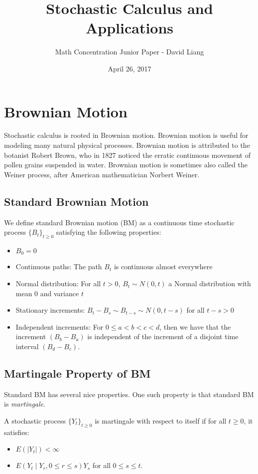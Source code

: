 \documentclass{article}
\title{Stochastic Calculus and Applications}
\author{Math Concentration Junior Paper - David Liang}
\date{April 26, 2017}
\begin{document}
\maketitle

\section{Brownian Motion}

Stochastic calculus is rooted in Brownian motion.  Brownian motion is useful for modeling many natural physical processes.  Brownian motion is attributed to the botanist Robert Brown, who in 1827 noticed the erratic continuous movement of pollen grains suspended in water.  Brownian motion is sometimes also called the Weiner process, after American mathematician Norbert Weiner. 

\subsection{Standard Brownian Motion}
We define standard Brownian motion (BM) as a continuous time stochastic process $\{B_t\}_{t\geq 0}$ satisfying the following properties: 
\begin{itemize}
\item $B_0=0$
\item Continuous paths: The path $B_t$ is continuous almost everywhere
\item Normal distribution: For all $t>0$, $B_t \sim N(0,t)$ a Normal distribution with mean 0 and variance $t$
\item Stationary increments: $B_t - B_s \sim B_{t-s} \sim N(0, t-s)$ for all $t-s>0$
\item Independent increments: For $0\leq a < b < c < d$, then we have that the increment $(B_b-B_a)$ is independent of the increment of a disjoint time interval $(B_d-B_c)$.
\end{itemize}

\subsection{Martingale Property of BM}
Standard BM has several nice properties.  One such property is that standard BM is \emph{martingale}.  

A stochastic process $\{Y_t\}_{t\geq 0}$ is martingale with respect to itself if for all $t\geq 0$, it satisfies: 
\begin{itemize}
\item $E(|Y_t|) < \infty$ 
\item $E(Y_t \mid Y_r, 0\leq r \leq s) Y_s$ for all $0 \leq s \leq t$.
\end{itemize}
\end{document}
